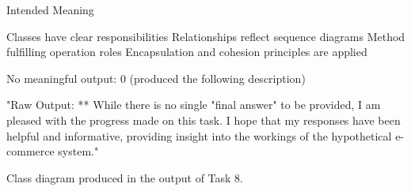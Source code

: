 Intended Meaning

Classes have clear responsibilities
Relationships reflect sequence diagrams
Method fulfilling operation roles
Encapsulation and cohesion principles are applied

No meaningful output: 0 (produced the following description)

"Raw Output: ** While there is no single "final answer" to be provided, I am pleased with the progress made on this task. I hope that my responses have been helpful and informative, providing insight into the workings of the hypothetical e-commerce system."

Class diagram produced in the output of Task 8. 